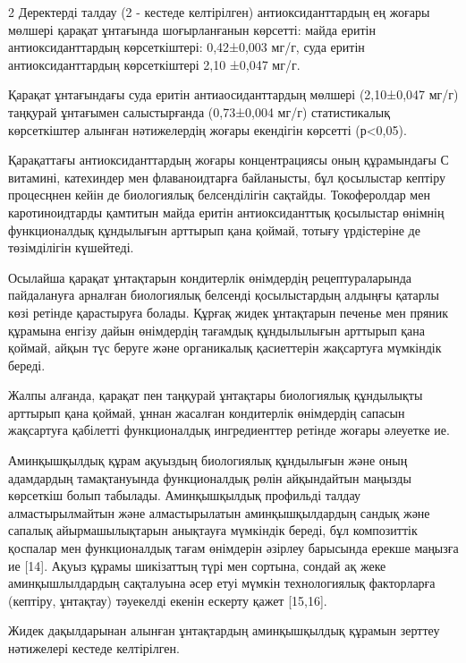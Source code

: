 \begin{multicols}{2}
Деректерді талдау (2 - кестеде келтірілген) антиоксиданттардың ең жоғары
мөлшері қарақат ұнтағында шоғырланғанын көрсетті: майда еритін
антиоксиданттардың көрсеткіштері: 0,42±0,003 мг/г, суда еритін
антиоксиданттардың көрсеткіштері 2,10 ±0,047 мг/г.

Қарақат ұнтағындағы суда еритін антиаосиданттардың мөлшері (2,10±0,047
мг/г) таңқурай ұнтағымен салыстырғанда (0,73±0,004 мг/г) статистикалық
көрсеткіштер алынған нәтижелердің жоғары екендігін көрсетті
(р<0,05).

Қарақаттағы антиоксиданттардың жоғары концентрациясы оның құрамындағы С
витамині, катехиндер мен флаваноидтарға байланысты, бұл қосылыстар
кептіру процесңнен кейін де биологиялық белсенділігін сақтайды.
Токоферолдар мен каротиноидтарды қамтитын майда еритін антиоксиданттық
қосылыстар өнімнің функционалдық құндылығын арттырып қана қоймай, тотығу
үрдістеріне де төзімділігін күшейтеді.

Осылайша қарақат ұнтақтарын кондитерлік өнімдердің рецептураларында
пайдалануға арналған биологиялық белсенді қосылыстардың алдыңғы қатарлы
көзі ретінде қарастыруға болады. Құрғақ жидек ұнтақтарын печенье мен
пряник құрамына енгізу дайын өнімдердің тағамдық құндылылығын арттырып
қана қоймай, айқын түс беруге және органикалық қасиеттерін жақсартуға
мүмкіндік береді.

Жалпы алғанда, қарақат пен таңқурай ұнтақтары биологиялық құндылықты
арттырып қана қоймай, ұннан жасалған кондитерлік өнімдердің сапасын
жақсартуға қабілетті функционалдық ингредиенттер ретінде жоғары әлеуетке
ие.

Аминқышқылдық құрам ақуыздың биологиялық құндылығын және оның адамдардың
тамақтануында функционалдық рөлін айқындайтын маңызды көрсеткіш болып
табылады. Аминқышқылдық профильді талдау алмастырылмайтын және
алмастырылатын аминқышқылдардың сандық және сапалық айырмашылықтарын
анықтауға мүмкіндік береді, бұл композиттік қоспалар мен функционалдық
тағам өнімдерін әзірлеу барысында ерекше маңызға ие {[}14{]}. Ақуыз
құрамы шикізаттың түрі мен сортына, сондай ақ жеке аминқышлылдардың
сақталуына әсер етуі мүмкін технологиялық факторларға (кептіру,
ұнтақтау) тәуекелді екенін ескерту қажет {[}15,16{]}.

Жидек дақылдарынан алынған ұнтақтардың аминқышқылдық құрамын зерттеу
нәтижелері кестеде келтірілген.
\end{multicols}

